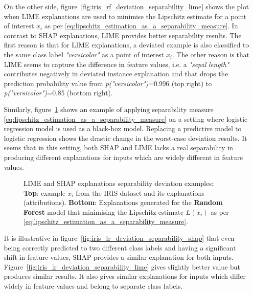 \documentclass[english]{tktltiki2}
\theoremstyle{definition}
\theoremstyle{remark}
\begin{document}
On the other side, figure~\ref{fig:iris_rf_deviation_separability_lime} shows the plot when LIME explanations are used to minimise the Lipschitz estimate for a point of interest $x_i$ as per \eqref{eq:lipschitz_estimation_as_a_separability_measure}. In contrast to SHAP explanations, LIME provides better separability results. The first reason is that for LIME explanations, a deviated example is also classified to the same class label \textit{"versicolor"} as a point of interest $x_i$. The other reason is that LIME seems to capture the difference in feature values, i.e. a \textit{"sepal length"} contributes negatively in deviated instance explanation and that drops the prediction probability value from \textit{p("versicolor")}=0.996 (top right) to \textit{p("versicolor")}=0.85 (bottom right).


Similarly, figure~\ref{fig:iris_lr_deviation_separability} shows an example of applying separability measure \eqref{eq:lipschitz_estimation_as_a_separability_measure} on a setting where logistic regression model is used as a black-box model. Replacing a predictive model to logistic regression shows the drastic change in the worst-case deviation results. It seems that in this setting, both SHAP and LIME lacks a real separability in producing different explanations for inputs which are widely different in feature values.
\begin{figure}[H]
	\hspace*{\fill}%
	\caption{LIME and SHAP explanations separability deviation examples: \textbf{Top}: example $x_i$ from the IRIS dataset and its explanations (attributions). \textbf{Bottom}: Explanations generated for the \textbf{Random Forest} model that minimising the Lipschitz estimate $L(x_i)$ as per \eqref{eq:lipschitz_estimation_as_a_separability_measure}.}%
	\label{fig:iris_lr_deviation_separability}%
\end{figure}

It is illustrative in figure~\ref{fig:iris_lr_deviation_separability_shap} that even being correctly predicted to two different class labels and having a significant shift in feature values, SHAP provides a similar explanation for both inputs. Figure~\ref{fig:iris_lr_deviation_separability_lime} gives slightly better value but produces similar results. It also gives similar explanations for inputs which differ widely in feature values and belong to separate class labels.
\end{document}
